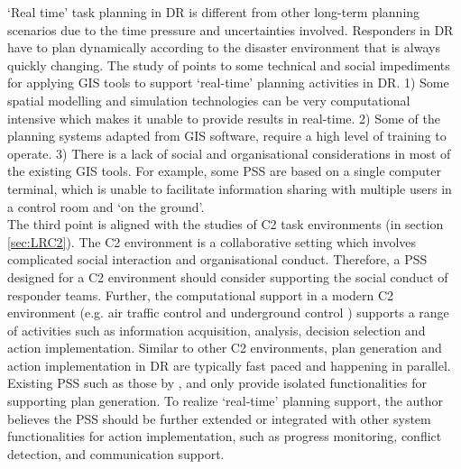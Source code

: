 `Real time' task planning in \ac{DR} is different from other long-term planning scenarios due to the time pressure and uncertainties involved.  Responders in \ac{DR} have to plan dynamically according to the disaster environment that is always quickly changing. The study of \cite{Zerger2003} points to some technical and social impediments for applying \ac{GIS} tools to support `real-time' planning activities in \ac{DR}. 1) Some spatial modelling and simulation technologies \citep{Eglese1994} can be very computational intensive which makes it unable to provide results in real-time. 2) Some of the planning systems adapted from \ac{GIS} software, require a high level of training to operate. 3) There is a lack of social and organisational considerations in most of the existing \ac{GIS} tools. For example, some \ac{PSS} are based on a single computer terminal, which is unable to facilitate information sharing with multiple users in a control room and `on the ground'. \\

The third point is aligned with the studies of \ac{C2} task environments (in section \ref{sec:LRC2}). The \ac{C2} environment is a collaborative setting which involves complicated social interaction and organisational conduct. Therefore, a \ac{PSS} designed for a \ac{C2} environment should consider supporting the social conduct of responder teams. Further, the computational support in a modern \ac{C2} environment (e.g. air traffic control \citep{Mercer2014} and underground control \citep{Sharples2011}) supports a range of activities such as information acquisition, analysis, decision selection and action implementation. Similar to other \ac{C2} environments, plan generation and action implementation in DR are typically fast paced and happening in parallel. Existing \ac{PSS} such as those by \citep{IntergraphCorporation2000}, and \citep{Eglese1994} only provide isolated functionalities for supporting plan generation. To realize `real-time' planning support, the author believes the \ac{PSS} should be further extended or integrated with other system functionalities for action implementation, such as progress monitoring, conflict detection, and communication support.\\


